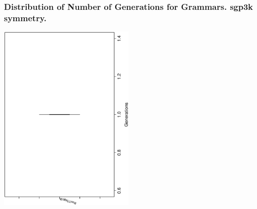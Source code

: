  \begin{frame}
 \frametitle{ Distribution of Number of Generations for Grammars. sgp3k  symmetry. }
 \begin{center}
\includegraphics[width=0.5\textwidth, angle=-90]
{ExpFboxplottGenerations001.eps}
 \end{center}
 \label{ExpFboxplottGenerations001.eps}  
 \end{frame}

